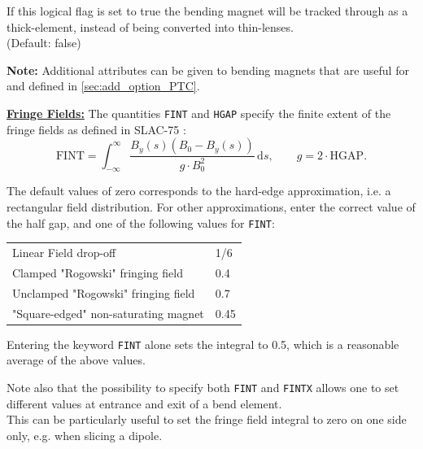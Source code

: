 \begin{madlist}

    If this logical flag is set to true the bending 
   magnet will be tracked through as a thick-element, instead of being
   converted into thin-lenses. \\
   (Default: false)
\end{madlist}

{\bf Note:} Additional attributes can be given to bending magnets that
are useful for \ptc and defined in \ref{sec:add_option_PTC}.

\vskip 5mm
{\bf \underline{Fringe Fields:}}
\vskip 3mm
The quantities {\tt FINT} and {\tt HGAP} specify the finite extent of the fringe
fields as defined in SLAC-75 \cite{slac75}:
\begin{equation}
\mathrm{FINT}=\int_{-\infty}^\infty \frac{B_y(s)(B_0-B_y(s))}{g \cdot
  B_0^2}\,\mathrm{d}s ,\quad\quad g=2\cdot \mathrm{HGAP}. 
\end{equation}

The default values of zero corresponds to the hard-edge approximation,
i.e. a rectangular field distribution. For other approximations, enter
the correct value of the half gap, and one of the following values for
{\tt FINT}: 
 
\begin{center}
  \begin{tabular}{l l}
    Linear Field drop-off                   &  1/6 \\
    Clamped "Rogowski" fringing field       &  0.4 \\
    Unclamped "Rogowski" fringing field     &  0.7 \\
    "Square-edged" non-saturating magnet    &  0.45
  \end{tabular}
\end{center}


Entering the keyword {\tt FINT} alone sets the integral to 0.5, which is a
reasonable average of the above values.  

Note also that the possibility to specify both {\tt FINT} and {\tt FINTX}  
allows
one to set different values at entrance and exit of a bend element. \\ 
This can be particularly useful to set the fringe field integral to zero
on one side only, e.g. when slicing a dipole.  


